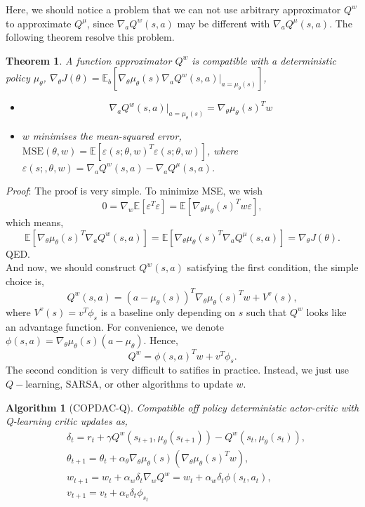 \documentclass[11pt,a4paper]{article}
\def\epsilon{\varepsilon}
\def\E{\mathbb{E}}
\newtheorem{theorem}{Theorem}[subsection]
\newtheorem{algorithm}{Algorithm}[subsection]
\begin{document}
Here, we should notice a problem that we can not use arbitrary approximator $Q^w$ to approximate $Q^{\mu}$, since $\nabla_{a}Q^w(s,a)$ may be different with $\nabla_a Q^{\mu}(s,a)$. The following theorem resolve this problem.
\begin{theorem}
A function approximator $Q^w$ is compatible with a deterministic policy $\mu_\theta$, $\nabla_\theta J(\theta) = \E_b[\nabla_\theta \mu_\theta(s)\nabla_a Q^w(s,a)|_{a=\mu_{\theta}(s)}]$,
\begin{itemize}
\item 
\begin{equation}
\nabla_a Q^w(s,a)|_{a=\mu_{\theta}(s)} = \nabla_{\theta}\mu_{\theta}(s)^T w
\end{equation}
\item 
$w$ minimises the mean-squared error, $\mathrm{MSE}(\theta,w)=\E[\epsilon(s;\theta,w)^T\epsilon(s;\theta,w)]$, where $\epsilon(s;,\theta,w) = \nabla_a Q^w(s,a) -\nabla_a Q^{\mu}(s,a)$.
\end{itemize}
\end{theorem}
\emph{Proof}:
The proof is very simple. To minimize MSE, we wish
\begin{equation}
0 = \nabla_w \E[\epsilon^T\epsilon] = \E[\nabla_{\theta}\mu_{\theta}(s)^Tw \epsilon],
\end{equation}
which means,
\begin{equation}
\E[\nabla_{\theta}\mu_{\theta}(s)^T\nabla_a Q^w(s,a)] = \E[\nabla_{\theta}\mu_{\theta}(s)^T \nabla_a Q^{\mu}(s,a)] = \nabla_\theta J(\theta).
\end{equation}
QED. \\ 
And now, we should construct $Q^w(s,a)$ satisfying the first condition, the simple choice is,
\begin{equation}
Q^w(s,a) = (a-\mu_{\theta}(s))^T\nabla_{\theta}\mu_\theta(s)^Tw + V^v(s),
\end{equation}
where $V^v(s) = v^T\phi_s$ is a baseline only depending on $s$ such that $Q^w$ looks like an advantage function. For convenience, we denote $\phi(s,a) = \nabla_{\theta}\mu_{\theta}(s)(a-\mu_{\theta})$. Hence, 
\begin{equation}
Q^w = \phi(s,a)^T w + v^T \phi_s.
\end{equation}
The second condition is very difficult to satifies in practice. Instead, we just use $Q-$learning, SARSA, or other algorithms to update $w$.
\begin{algorithm}[COPDAC-Q]
Compatible off policy deterministic actor-critic with Q-learning critic updates as,
\begin{align}
& \delta_t = r_t + \gamma Q^w(s_{t+1},\mu_{\theta}(s_{t+1}))-Q^w(s_t,\mu_{\theta}(s_t)), \\ 
& \theta_{t+1} = \theta_t + \alpha_{\theta} \nabla_{\theta}\mu_{\theta}(s)(\nabla_{\theta}\mu_{\theta}(s)^Tw), \\ 
& w_{t+1} = w_t + \alpha_w \delta_t \nabla_w Q^w = w_t + \alpha_w \delta_t \phi(s_t,a_t), \\
& v_{t+1} = v_t + \alpha_v \delta_t \phi_{s_t}
\end{align}
\end{algorithm}
\end{document}
